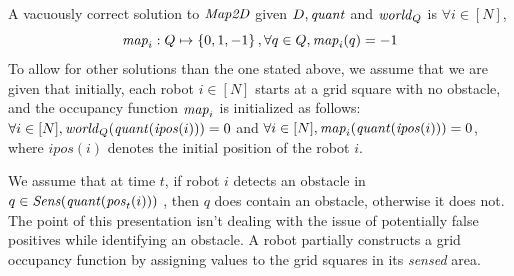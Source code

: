 A vacuously correct solution to $\mathit{Map2D}$ given $D, \mathit{quant}$ and $\mathit{world}_Q$ is $\forall i \in [N]$, $$\mathit{map}_i : Q \mapsto \left\{0,1,-1\right\}, \forall  q \in Q , \mathit{map}_i(q)= -1$$ To allow for other solutions than the one stated above, we assume that we are given that initially, each robot $i\in[N]$ starts at a grid square with no obstacle, and the occupancy function $\mathit{map}_i$ is initialized as follows:
 $\forall i \in [N], \mathit{world}_Q(\mathit{quant}(\mathit{ipos}(i))) = 0$ and 
 $\forall i \in [N], \mathit{map}_i(\mathit{quant}(\mathit{ipos}(i))) = 0$,
  where $\mathit{ipos}(i)$ denotes the initial position of the robot $i$. 


We assume that at time $t$, if robot $i$ detects an obstacle in $q \in \mathit{Sens}(\mathit{quant}(\mathit{pos}_t(i)))$ , then $q$ does contain an obstacle, otherwise it does not. The point of this presentation isn't dealing with the issue of potentially false positives while identifying an obstacle. A robot partially constructs a grid occupancy function by assigning values to the grid squares in its \emph{sensed} area.





